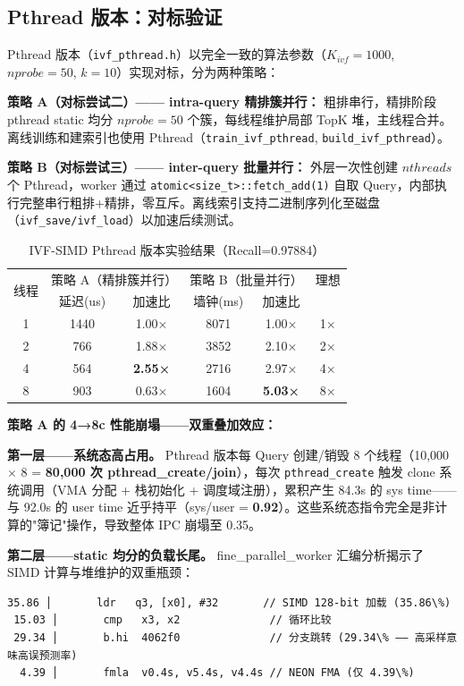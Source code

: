 \documentclass[UTF8,a4paper,10pt]{ctexart}
\begin{document}
\subsection{Pthread 版本：对标验证}

Pthread 版本（\texttt{ivf\_pthread.h}）以完全一致的算法参数（$K_{ivf}=1000$, $nprobe=50$, $k=10$）实现对标，分为两种策略：

\textbf{策略 A（对标尝试二）—— intra-query 精排簇并行：} 粗排串行，精排阶段 pthread static 均分 $nprobe=50$ 个簇，每线程维护局部 TopK 堆，主线程合并。离线训练和建索引也使用 Pthread（\texttt{train\_ivf\_pthread}, \texttt{build\_ivf\_pthread}）。

\textbf{策略 B（对标尝试三）—— inter-query 批量并行：} 外层一次性创建 $nthreads$ 个 Pthread，worker 通过 \texttt{atomic<size\_t>::fetch\_add(1)} 自取 Query，内部执行完整串行粗排+精排，零互斥。离线索引支持二进制序列化至磁盘（\texttt{ivf\_save/ivf\_load}）以加速后续测试。

\begin{table}[H]
\centering
\caption{IVF-SIMD Pthread 版本实验结果（Recall=0.97884）}
\begin{tabular}{cccccc}
\hline
\multirow{2}{*}{线程} & \multicolumn{2}{c}{策略 A（精排簇并行）} & \multicolumn{2}{c}{策略 B（批量并行）} & 理想 \\
& 延迟(us) & 加速比 & 墙钟(ms) & 加速比 & \\
\hline
1 & 1440 & 1.00× & 8071 & 1.00× & 1× \\
2 & 766  & 1.88× & 3852 & 2.10× & 2× \\
4 & 564  & \textbf{2.55×} & 2716 & 2.97× & 4× \\
8 & 903  & 0.63× & 1604 & \textbf{5.03×} & 8× \\
\hline
\end{tabular}
\end{table}

\textbf{策略 A 的 4→8c 性能崩塌——双重叠加效应：}

\textbf{第一层——系统态高占用。} Pthread 版本每 Query 创建/销毁 8 个线程（10,000 $\times$ 8 = \textbf{80,000 次 pthread\_create/join}），每次 \texttt{pthread\_create} 触发 clone 系统调用（VMA 分配 + 栈初始化 + 调度域注册），累积产生 84.3s 的 sys time——与 92.0s 的 user time 近乎持平（sys/user = \textbf{0.92}）。这些系统态指令完全是非计算的"簿记"操作，导致整体 IPC 崩塌至 0.35。

\textbf{第二层——static 均分的负载长尾。} fine\_parallel\_worker 汇编分析揭示了 SIMD 计算与堆维护的双重瓶颈：

\begin{lstlisting}[language={[x86masm]Assembler}, caption={fine\_parallel\_worker 汇编：SIMD 加载 + 循环分支双重热点}]
 35.86 │       ldr   q3, [x0], #32       // SIMD 128-bit 加载 (35.86\%)
 15.03 │       cmp   x3, x2              // 循环比较
 29.34 │       b.hi  4062f0              // 分支跳转 (29.34\% —— 高采样意味高误预测率)
  4.39 │       fmla  v0.4s, v5.4s, v4.4s // NEON FMA (仅 4.39\%)
\end{lstlisting}
\end{document}
